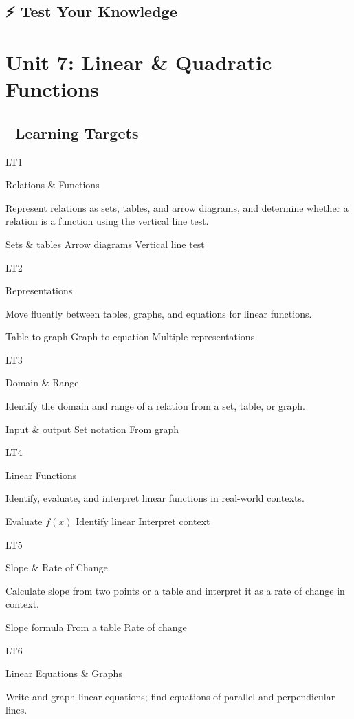 \documentclass[
  letterpaper,
  DIV=11,
  numbers=noendperiod]{scrreprt}
\theoremstyle{definition}
\theoremstyle{remark}
\begin{document}
\section{⚡ Test Your Knowledge}\label{test-your-knowledge-1}

\chapter{Unit 7: Linear \& Quadratic
Functions}\label{unit-7-linear-quadratic-functions}

\section{🎯 Learning Targets}\label{learning-targets-6}

LT1

Relations \& Functions

Represent relations as sets, tables, and arrow diagrams, and determine
whether a relation is a function using the vertical line test.

{Sets \& tables} {Arrow diagrams} {Vertical line test}

LT2

Representations

Move fluently between tables, graphs, and equations for linear
functions.

{Table to graph} {Graph to equation} {Multiple representations}

LT3

Domain \& Range

Identify the domain and range of a relation from a set, table, or graph.

{Input \& output} {Set notation} {From graph}

LT4

Linear Functions

Identify, evaluate, and interpret linear functions in real-world
contexts.

{Evaluate \(f(x)\)} {Identify linear} {Interpret context}

LT5

Slope \& Rate of Change

Calculate slope from two points or a table and interpret it as a rate of
change in context.

{Slope formula} {From a table} {Rate of change}

LT6

Linear Equations \& Graphs

Write and graph linear equations; find equations of parallel and
perpendicular lines.
\end{document}
